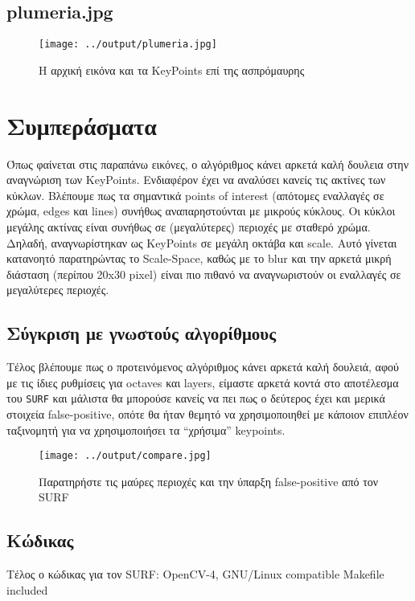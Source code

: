 \documentclass[11pt]{scrartcl} %
\begin{document}
\subsection{plumeria.jpg}
\begin{figure}[H]
  \centerline{\texttt{[image: ../output/plumeria.jpg]}}
  \caption{H αρχική εικόνα και τα KeyPoints επί της ασπρόμαυρης}
\end{figure}

\section{Συμπεράσματα}

Όπως φαίνεται στις παραπάνω εικόνες, ο αλγόριθμος κάνει αρκετά καλή δουλεια στην αναγνώριση των KeyPoints.
Ενδιαφέρον έχει να αναλύσει κανείς τις ακτίνες των κύκλων. Βλέπουμε πως τα σημαντικά points of interest
(απότομες εναλλαγές σε χρώμα, edges και lines) συνήθως αναπαρηστούνται με μικρούς κύκλους.
Οι κύκλοι μεγάλης ακτίνας είναι συνήθως σε (μεγαλύτερες) περιοχές με σταθερό χρώμα. Δηλαδή, αναγνωρίστηκαν ως
KeyPoints σε μεγάλη οκτάβα και scale. Aυτό γίνεται κατανοητό παρατηρώντας το Scale-Space, καθώς με το
blur και την αρκετά μικρή διάσταση (περίπου 20x30 pixel) είναι πιο πιθανό να αναγνωριστούν
οι εναλλαγές σε μεγαλύτερες περιοχές.

\subsection{Σύγκριση με γνωστούς αλγορίθμους}
Τέλος βλέπουμε πως ο προτεινόμενος αλγόριθμος κάνει αρκετά καλή δουλειά, αφού με τις ίδιες ρυθμίσεις για
octaves και layers, είμαστε αρκετά κοντά στο αποτέλεσμα του \texttt{SURF} και μάλιστα θα μπορούσε κανείς
να πει πως ο δεύτερος έχει και μερικά στοιχεία false-positive, οπότε θα ήταν θεμητό να χρησιμοποιηθεί με
κάποιον επιπλέον ταξινομητή για να χρησιμοποιήσει τα ``χρήσιμα'' keypoints.

\begin{figure}[H]
  \centerline{\texttt{[image: ../output/compare.jpg]}}
  \caption{Παρατηρήστε τις μαύρες περιοχές και την ύπαρξη false-positive από τον SURF}
\end{figure}

\subsection{Κώδικας}

Τέλος ο κώδικας για τον SURF:
{OpenCV-4, GNU/Linux compatible Makefile included}
\end{document}
